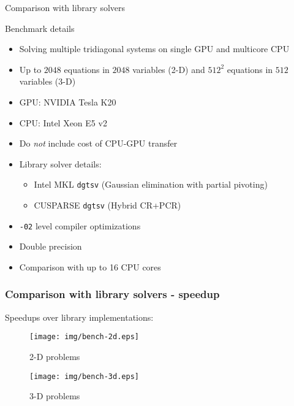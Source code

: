 \begin{frame}{Comparison with library solvers}
\footnotesize
\begin{block}{Benchmark details}
\begin{itemize}
\item Solving multiple tridiagonal systems on single GPU and multicore CPU
\item Up to $2048$ equations in $2048$ variables (2-D)
    and $512^2$ equations in $512$ variables (3-D)
\item GPU: NVIDIA Tesla K20
\item CPU: Intel Xeon E5 v2
\item Do \emph{not} include cost of CPU-GPU transfer
\item Library solver details:
\begin{itemize}
    \footnotesize
    \item Intel MKL \texttt{dgtsv} (Gaussian elimination with partial pivoting)
    \item CUSPARSE \texttt{dgtsv} (Hybrid CR+PCR)
\end{itemize}
\item \texttt{-02} level compiler optimizations
\item Double precision
\item Comparison with up to 16 CPU cores
\end{itemize}
\end{block}
\end{frame}

\begin{frame}
\frametitle{Comparison with library solvers - speedup}
Speedups over library implementations:

\begin{figure}
\begin{minipage}{.45\textwidth}
    \centering
    \texttt{[image: img/bench-2d.eps]}
    \caption{2-D problems}
\end{minipage}
\begin{minipage}{.45\textwidth}
    \centering
    \texttt{[image: img/bench-3d.eps]}
    \caption{3-D problems}
\end{minipage}
\end{figure}
\end{frame}

